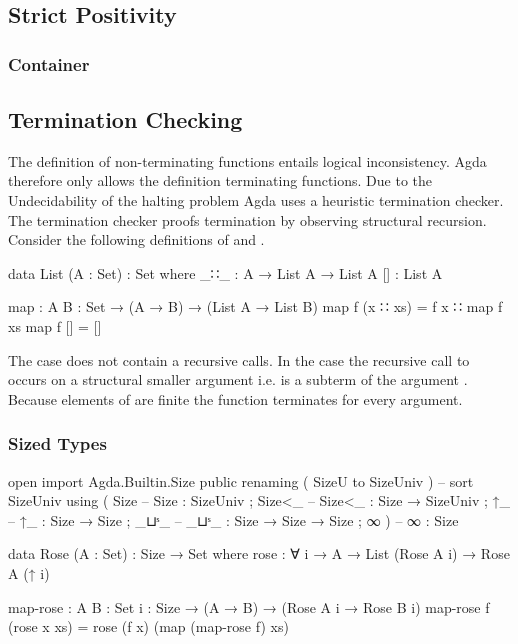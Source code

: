 \documentclass[10pt,a4paper,twoside]{report}
\begin{document}
\subsection{Strict Positivity}

\subsubsection{Container}

\subsection{Termination Checking}

The definition of non-terminating functions entails logical inconsistency.
Agda therefore only allows the definition terminating functions.
Due to the Undecidability of the halting problem Agda uses a heuristic termination checker.
The termination checker proofs termination by observing structural recursion.
Consider the following definitions of  and .

\begin{code}
data List (A : Set) : Set where
  _∷_  : A → List A → List A
  []   : List A

map : {A B : Set} → (A → B) → (List A → List B)
map f (x ∷ xs)  = f x ∷ map f xs
map f []        = []
\end{code}

The \AgdaInductiveConstructor{[]} case does not contain a recursive calls.
In the  case the recursive call to
 occurs on a structural smaller argument i.e.
 is a subterm of the argument
\;\;.
Because elements of  are finite the function
 terminates for every argument.

\subsubsection{Sized Types}

\begin{code}
open import Agda.Builtin.Size public
  renaming ( SizeU to SizeUniv )  --  sort SizeUniv
  using    ( Size                 --  Size   : SizeUniv
           ; Size<_               --  Size<_ : Size → SizeUniv
           ; ↑_                   --  ↑_     : Size → Size
           ; _⊔ˢ_                 --  _⊔ˢ_   : Size → Size → Size
           ; ∞ )                  --  ∞      : Size

data Rose (A : Set) : Size → Set where
  rose : ∀ {i} → A → List (Rose A i) → Rose A (↑ i)

map-rose : {A B : Set} {i : Size} → (A → B) → (Rose A i → Rose B i)
map-rose f (rose x xs) = rose (f x) (map (map-rose f) xs)
\end{code}
\end{document}
